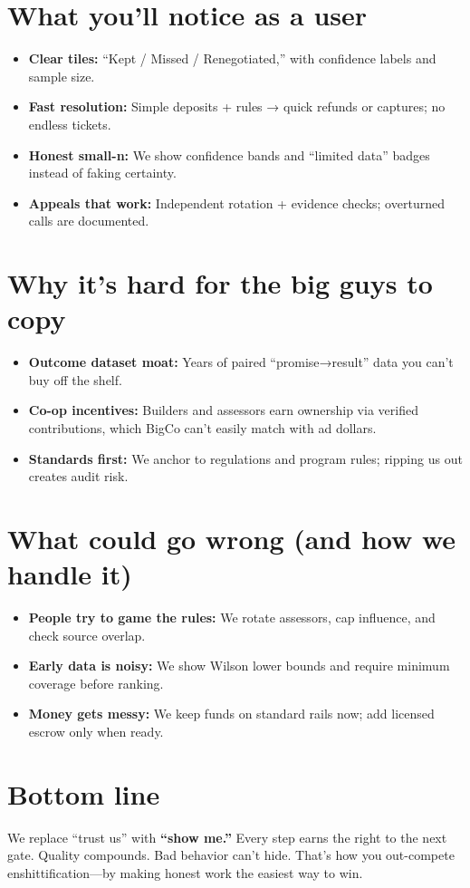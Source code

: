 \documentclass[11pt]{article}
\begin{document}
\section*{What you’ll notice as a user}
\label{sec:org0b164d7}
\begin{itemize}
\item \textbf{Clear tiles:} “Kept / Missed / Renegotiated,” with confidence labels and sample size.
\item \textbf{Fast resolution:} Simple deposits + rules → quick refunds or captures; no endless tickets.
\item \textbf{Honest small-n:} We show confidence bands and “limited data” badges instead of faking certainty.
\item \textbf{Appeals that work:} Independent rotation + evidence checks; overturned calls are documented.
\end{itemize}
\section*{Why it’s hard for the big guys to copy}
\label{sec:org7a5b4c9}
\begin{itemize}
\item \textbf{\textbf{Outcome dataset moat:}} Years of paired “promise→result” data you can’t buy off the shelf.
\item \textbf{\textbf{Co-op incentives:}} Builders and assessors earn ownership via verified contributions,
which BigCo can’t easily match with ad dollars.
\item \textbf{\textbf{Standards first:}} We anchor to regulations and program rules; ripping us out creates audit risk.
\end{itemize}
\section*{What could go wrong (and how we handle it)}
\label{sec:orga48f14a}
\begin{itemize}
\item \textbf{People try to game the rules:} We rotate assessors, cap influence, and check source overlap.
\item \textbf{Early data is noisy:} We show Wilson lower bounds and require minimum coverage before ranking.
\item \textbf{Money gets messy:} We keep funds on standard rails now; add licensed escrow only when ready.
\end{itemize}
\section*{Bottom line}
\label{sec:org63b589f}
We replace “trust us” with \textbf{“show me.”}  
Every step earns the right to the next gate. Quality compounds. Bad behavior can’t hide.  
That’s how you out-compete enshittification—by making honest work the easiest way to win.
\end{document}
